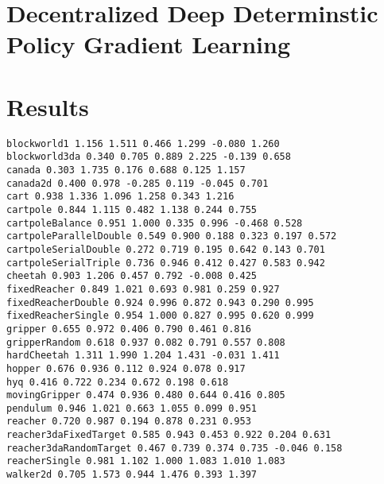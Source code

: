 \documentclass{article} %
\numberwithin{equation}{subsection}
\numberwithin{theorem}{subsection}
\begin{document}



\section{Decentralized Deep Determinstic Policy Gradient Learning}





\section{Results}
\begin{verbatim}
blockworld1 1.156 1.511 0.466 1.299 -0.080 1.260
blockworld3da 0.340 0.705 0.889 2.225 -0.139 0.658
canada 0.303 1.735 0.176 0.688 0.125 1.157
canada2d 0.400 0.978 -0.285 0.119 -0.045 0.701
cart 0.938 1.336 1.096 1.258 0.343 1.216
cartpole 0.844 1.115 0.482 1.138 0.244 0.755
cartpoleBalance 0.951 1.000 0.335 0.996 -0.468 0.528
cartpoleParallelDouble 0.549 0.900 0.188 0.323 0.197 0.572
cartpoleSerialDouble 0.272 0.719 0.195 0.642 0.143 0.701
cartpoleSerialTriple 0.736 0.946 0.412 0.427 0.583 0.942
cheetah 0.903 1.206 0.457 0.792 -0.008 0.425
fixedReacher 0.849 1.021 0.693 0.981 0.259 0.927
fixedReacherDouble 0.924 0.996 0.872 0.943 0.290 0.995
fixedReacherSingle 0.954 1.000 0.827 0.995 0.620 0.999
gripper 0.655 0.972 0.406 0.790 0.461 0.816
gripperRandom 0.618 0.937 0.082 0.791 0.557 0.808
hardCheetah 1.311 1.990 1.204 1.431 -0.031 1.411
hopper 0.676 0.936 0.112 0.924 0.078 0.917
hyq 0.416 0.722 0.234 0.672 0.198 0.618
movingGripper 0.474 0.936 0.480 0.644 0.416 0.805
pendulum 0.946 1.021 0.663 1.055 0.099 0.951
reacher 0.720 0.987 0.194 0.878 0.231 0.953
reacher3daFixedTarget 0.585 0.943 0.453 0.922 0.204 0.631
reacher3daRandomTarget 0.467 0.739 0.374 0.735 -0.046 0.158
reacherSingle 0.981 1.102 1.000 1.083 1.010 1.083
walker2d 0.705 1.573 0.944 1.476 0.393 1.397
\end{verbatim}
\end{document}
